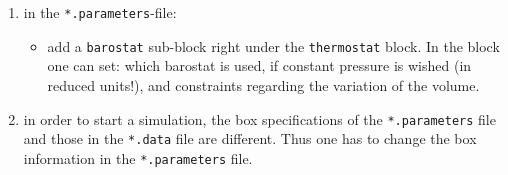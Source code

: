 \documentclass[11pt]{article}
\begin{document}
\begin{enumerate}
\item in the \texttt{*.parameters}-file:

\begin{itemize}
\item add a \texttt{barostat} sub-block right under the \texttt{thermostat} block. In the block one can set: which barostat is used, if constant pressure is wished (in reduced units!), and constraints regarding the variation of the volume.
\end{itemize}

\item in order to start a simulation, the box specifications of the \texttt{*.parameters} file and those in the \texttt{*.data} file are different. Thus one has to change the box information in the \texttt{*.parameters} file.
\end{enumerate}
\end{document}
